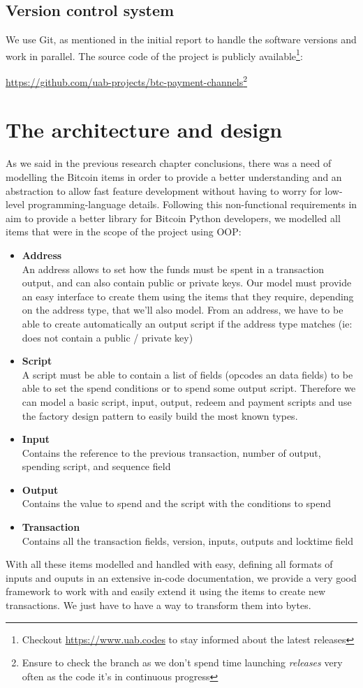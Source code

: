 \subsection{Version control system}
We use Git, as mentioned in the initial report to handle the software versions and work in parallel. The source code of the project is publicly available\footnote{Checkout \url{https://www.uab.codes} to stay informed about the latest releases}:
\begin{center}
\url{https://github.com/uab-projects/btc-payment-channels}\footnote{Ensure to check the  branch as we don't spend time launching \textit{releases} very often as the code it's in continuous progress}
\end{center}

\section{The architecture and design}
As we said in the previous research chapter conclusions, there was a need of modelling the Bitcoin items in order to provide a better understanding and an abstraction to allow fast feature development without having to worry for low-level programming-language details. Following this non-functional requirements in aim to provide a better library for Bitcoin Python developers, we modelled all items that were in the scope of the project using OOP:
\begin{itemize}
    \item \textbf{Address}\\ An address allows to set how the funds must be spent in a transaction output, and can also contain public or private keys. Our model must provide an easy interface to create them using the items that they require, depending on the address type, that we'll also model. From an address, we have to be able to create automatically an output script if the address type matches (ie: does not contain a public / private key)
    \item \textbf{Script}\\ A script must be able to contain a list of fields (opcodes an data fields) to be able to set the spend conditions or to spend some output script. Therefore we can model a basic script, input, output, redeem and payment scripts and use the factory design pattern to easily build the most known types.
    \item \textbf{Input}\\ Contains the reference to the previous transaction, number of output, spending script, and sequence field
    \item \textbf{Output}\\ Contains the value to spend and the script with the conditions to spend
    \item \textbf{Transaction} \\ Contains all the transaction fields, version, inputs, outputs and locktime field
\end{itemize}
With all these items modelled and handled with easy, defining all formats of inputs and ouputs in an extensive in-code documentation, we provide a very good framework to work with and easily extend it using the items to create new transactions. We just have to have a way to transform them into bytes.
